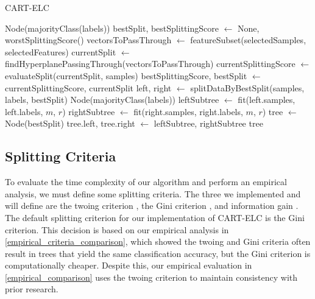 \documentclass[10pt]{article} %
\begin{document}
\begin{algorithm}[H]
	\caption{CART-ELC}
\begin{algorithmic}[1]
        \State \Return Node(majorityClass(labels)) 
    \EndIf
	\State bestSplit, bestSplittingScore $\gets$ None, worstSplittingScore()
            \State vectorsToPassThrough $\gets$ featureSubset(selectedSamples, selectedFeatures)
            \State currentSplit $\gets$ findHyperplanePassingThrough(vectorsToPassThrough)
            \State currentSplittingScore $\gets$ evaluateSplit(currentSplit, samples)
                \State bestSplittingScore, bestSplit  $\gets$ currentSplittingScore, currentSplit
            \EndIf
        \EndFor
    \EndFor
    \State left, right $\gets$ splitDataByBestSplit(samples, labels, bestSplit)
        \State \Return Node(majorityClass(labels)) 
	\EndIf
    \State leftSubtree $\gets$ fit(left.samples, left.labels, $m$, $r$)
	\State rightSubtree $\gets$ fit(right.samples, right.labels, $m$, $r$)
    \State tree $\gets$ Node(bestSplit)
    \State tree.left, tree.right $\gets$ leftSubtree, rightSubtree
    \State \Return tree
\EndFunction
\end{algorithmic}
\end{algorithm}

\subsection{Splitting Criteria}\label{splitting_criteria}

To evaluate the time complexity of our algorithm and perform an empirical analysis, we must define some splitting criteria. The three we implemented and will define are the twoing criterion \citep{breiman1984cart}, the Gini criterion \citep{breiman1984cart}, and information gain \citep{quinlan1986}. The default splitting criterion for our implementation of CART-ELC is the Gini criterion. This decision is based on our empirical analysis in \autoref{empirical_criteria_comparison}, which showed the twoing and Gini criteria often result in trees that yield the same classification accuracy, but the Gini criterion is computationally cheaper. Despite this, our empirical evaluation in \autoref{empirical_comparison} uses the twoing criterion to maintain consistency with prior research.
\end{document}
